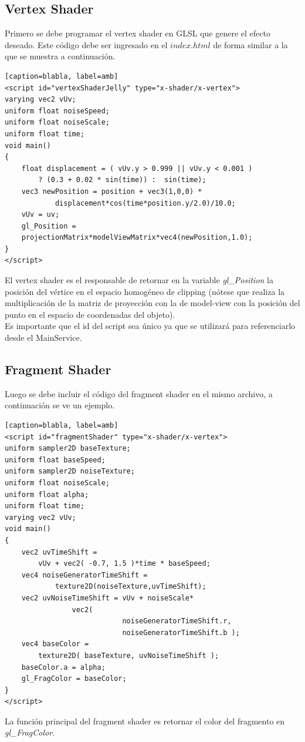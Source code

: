 \documentclass[12pt]{article}
\begin{document}
\subsection{Vertex Shader}
Primero se debe programar el vertex shader en GLSL que genere el efecto deseado. Este código debe ser ingresado en el $index.html$ de forma similar a la que se muestra a continuación.
\begin{lstlisting}[frame=single][caption=blabla, label=amb]
<script id="vertexShaderJelly" type="x-shader/x-vertex">
varying vec2 vUv;
uniform float noiseSpeed;
uniform float noiseScale;
uniform float time;
void main() 
{ 
    float displacement = ( vUv.y > 0.999 || vUv.y < 0.001 )
 		? (0.3 + 0.02 * sin(time)) :  sin(time);
    vec3 newPosition = position + vec3(1,0,0) * 
    		displacement*cos(time*position.y/2.0)/10.0;
    vUv = uv;
    gl_Position = 
	projectionMatrix*modelViewMatrix*vec4(newPosition,1.0);
}
</script>
\end{lstlisting}
El vertex shader es el responsable de retornar en la variable \textit{gl\_Position} la posición del vértice en el espacio homogéneo de clipping (nótese que realiza la multiplicación de la matriz de proyección con la de model-view con la posición del punto en el espacio de coordenadas del objeto).
\\Es importante que el id del script sea único ya que se utilizará para referenciarlo desde el MainService.
\clearpage
\subsection{Fragment Shader}
Luego se debe incluir el código del fragment shader en el mismo archivo, a continuación se ve un ejemplo.
\begin{lstlisting}[frame=single][caption=blabla, label=amb]
<script id="fragmentShader" type="x-shader/x-vertex"> 
uniform sampler2D baseTexture;
uniform float baseSpeed;
uniform sampler2D noiseTexture;
uniform float noiseScale;
uniform float alpha;
uniform float time;
varying vec2 vUv;
void main() 
{
	vec2 uvTimeShift = 
		vUv + vec2( -0.7, 1.5 )*time * baseSpeed;	
	vec4 noiseGeneratorTimeShift = 
			texture2D(noiseTexture,uvTimeShift);
	vec2 uvNoiseTimeShift = vUv + noiseScale*
    			vec2(
                    		noiseGeneratorTimeShift.r, 
                    		noiseGeneratorTimeShift.b );
	vec4 baseColor = 
		texture2D( baseTexture, uvNoiseTimeShift );
	baseColor.a = alpha;
	gl_FragColor = baseColor;
}  
</script>
\end{lstlisting}
La función principal del fragment shader es retornar el color del fragmento en \textit{gl\_FragColor}.
\end{document}
